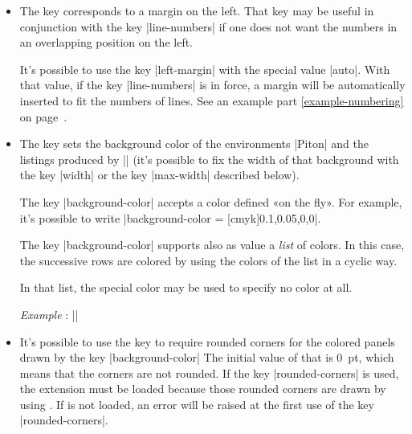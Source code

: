 \documentclass{article}
\begin{document}
\begin{itemize}
\begin{itemize}
The initial value is |\footnotesize\color{gray}|. 
\end{itemize}

For convenience, a mechanism of factorisation of the prefix |line-numbers| is
provided. That means that it is possible, for instance, to write:
\begin{Verbatim}
\PitonOptions
  {
    line-numbers = 
      { 
        skip-empty-lines = false ,
        label-empty-lines = false ,
        sep = 1 em ,
        format = \footnotesize \color{blue}
      }
  }
\end{Verbatim}

Be careful : the previous code is not enough to print the numbers of lines.
For that, one also has to use the key |line-numbers| is a absolute way, that
is to say without value.

\item {} The key  corresponds to a
margin on the left. That key may be useful in conjunction with the key
|line-numbers| if one does not want the numbers in an overlapping position on
the left. 

It's possible to use the key |left-margin| with the special value |auto|. With that
value, if the key |line-numbers| is in force, a margin will be automatically
inserted to fit the numbers of lines. See an example part
\ref{example-numbering} on page~\pageref{example-numbering}.

\item {} \label{background-color} The key
 sets the background color of the environments
|{Piton}| and the listings produced by |\PitonInputFile| (it's possible to fix
the width of that background with the key |width| or the key |max-width|
described below).

The key |background-color| accepts a color
defined «on the fly». For example, it's possible to write
|background-color = [cmyk]{0.1,0.05,0,0}|.

\smallskip
The key |background-color| supports also as value a \emph{list} of colors. In
this case, the successive rows are colored by using the colors of the list in
a cyclic way.

\smallskip
In that list, the special color  may be used to specify no
color at all.

\emph{Example} : ||

\item {} 
It's possible to use the key  to require rounded
corners for the colored panels drawn by the key |background-color| The initial
value of that is $0$~pt, which means that the corners are not rounded. If the
key |rounded-corners| is used, the extension  must be loaded because
those rounded corners are drawn by using . If  is not
loaded, an error will be raised at the first use of the key |rounded-corners|.


\end{itemize}
\end{document}
